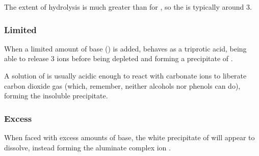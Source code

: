 				The extent of hydrolysis is much greater than for , so the \pH{} is typically around \num{3}.




			\subsubsection{Limited \texorpdfstring{}{OH⁻}}

				When a limited amount of base () is added,  behaves as a triprotic acid, being
				able to release 3  ions before being depleted and forming a precipitate of \ch{[\Al(H2O)3(OH)3] \stS}.


				A solution of  is usually acidic enough to react with carbonate ions to liberate carbon dioxide
				gas (which, remember, neither alcohols nor phenols can do), forming the insoluble precipitate.



			\subsubsection{Excess \texorpdfstring{}{OH⁻}}

				When faced with excess amounts of base, the white precipitate of \ch{[\Al(H2O)3(OH)3] \stS} will appear to dissolve, instead
				forming the aluminate complex ion \ch{[\Al(OH)4]- \stAq}.

